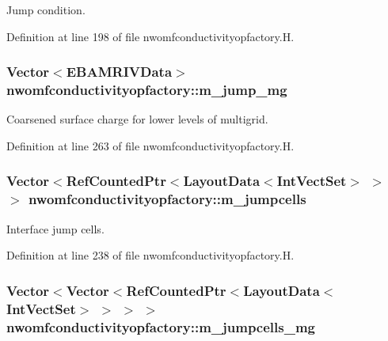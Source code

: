 Jump condition. 



Definition at line 198 of file nwomfconductivityopfactory.\+H.

\subsubsection[{\texorpdfstring{m\+\_\+jump\+\_\+mg}{m_jump_mg}}]{\setlength{\rightskip}{0pt plus 5cm}Vector$<${\bf E\+B\+A\+M\+R\+I\+V\+Data}$>$ nwomfconductivityopfactory\+::m\+\_\+jump\+\_\+mg\hspace{0.3cm}{\ttfamily [protected]}}\hypertarget{classnwomfconductivityopfactory_aea2b14dc47f61b785fb83366005a432c}{}\label{classnwomfconductivityopfactory_aea2b14dc47f61b785fb83366005a432c}


Coarsened surface charge for lower levels of multigrid. 



Definition at line 263 of file nwomfconductivityopfactory.\+H.

\subsubsection[{\texorpdfstring{m\+\_\+jumpcells}{m_jumpcells}}]{\setlength{\rightskip}{0pt plus 5cm}Vector$<$Ref\+Counted\+Ptr$<$Layout\+Data$<$Int\+Vect\+Set$>$ $>$ $>$ nwomfconductivityopfactory\+::m\+\_\+jumpcells\hspace{0.3cm}{\ttfamily [protected]}}\hypertarget{classnwomfconductivityopfactory_a9cdcd3fd284db8f96c7195c286094ec7}{}\label{classnwomfconductivityopfactory_a9cdcd3fd284db8f96c7195c286094ec7}


Interface jump cells. 



Definition at line 238 of file nwomfconductivityopfactory.\+H.

\subsubsection[{\texorpdfstring{m\+\_\+jumpcells\+\_\+mg}{m_jumpcells_mg}}]{\setlength{\rightskip}{0pt plus 5cm}Vector$<$Vector$<$Ref\+Counted\+Ptr$<$Layout\+Data$<$Int\+Vect\+Set$>$ $>$ $>$ $>$ nwomfconductivityopfactory\+::m\+\_\+jumpcells\+\_\+mg\hspace{0.3cm}{\ttfamily [protected]}}\hypertarget{classnwomfconductivityopfactory_ae8c6afddfc8dc92f9eb1a7d7ba9c89e0}{}\label{classnwomfconductivityopfactory_ae8c6afddfc8dc92f9eb1a7d7ba9c89e0}


